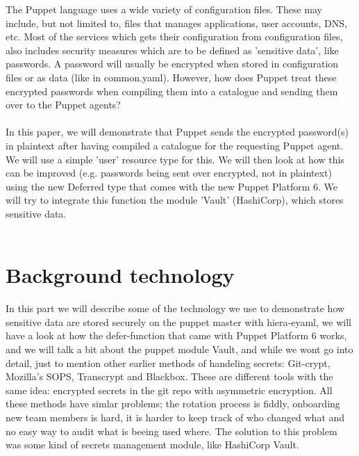 The Puppet language uses a wide variety of configuration files. These may include, but not limited to, files that manages applications, user accounts, DNS, etc. Most of the services which gets their configuration from configuration files, also includes security measures which are to be defined as 'sensitive data', like passwords. A password will usually be encrypted when stored in configuration files or as data (like in common.yaml). However, how does Puppet treat these encrypted passwords when compiling them into a catalogue and sending them over to the Puppet agents?
\\\\
In this paper, we will demonstrate that Puppet sends the encrypted password(s) in plaintext after having compiled a catalogue for the requesting Puppet agent. We will use a simple 'user' resource type for this. We will then look at how this can be improved (e.g. passwords being sent over encrypted, not in plaintext) using the new Deferred type that comes with the new Puppet Platform 6. We will try to integrate this function the module 'Vault' (HashiCorp), which stores sensitive data. 
\\\\

\section{Background technology}

In this part we will describe some of the technology we use to demonstrate how sensitive data are stored securely on the puppet master with hiera-eyaml, we will have a look at how the defer-function that came with Puppet Platform 6 works, and we will talk a bit about the puppet module Vault, and while we wont go into detail, just to mention other earlier methods of handeling secrets: Git-crypt, Mozilla's SOPS, Transcrypt and Blackbox. These are different tools with the same idea: encrypted secrets in the git repo with asymmetric encryption. All these methods have simlar problems; the rotation process is fiddly, onboarding new team members is hard, it is harder to keep track of who changed what and no easy way to audit what is beeing used where. The solution to this problem was some kind of secrets management module, like HashiCorp Vault.


